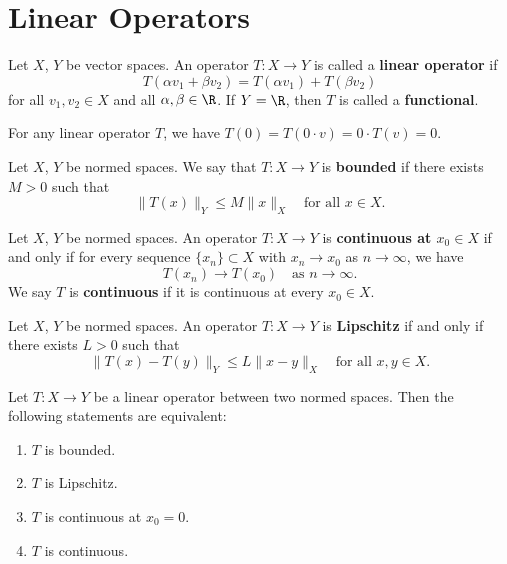 \section{Linear Operators}

\begin{definition}
Let $X$, $Y$ be vector spaces.  
An operator $T: X \to Y$ is called a \textbf{linear operator} if  
\[
T(\alpha v_1 + \beta v_2) = T(\alpha v_1) + T(\beta v_2)
\]
for all $v_1, v_2 \in X$ and all $\alpha, \beta \in \R$.  
If $Y = \R$, then $T$ is called a \textbf{functional}.
\end{definition}

\begin{remark}
For any linear operator $T$, we have $T(0) = T(0 \cdot v) = 0 \cdot T(v) = 0$.
\end{remark}

\begin{definition}
Let $X$, $Y$ be normed spaces.  
We say that $T: X \to Y$ is \textbf{bounded} if there exists $M > 0$ such that  
\[
\|T(x)\|_Y \leq M \|x\|_X \quad \text{for all } x \in X.
\]
\end{definition}

\begin{definition}
Let $X$, $Y$ be normed spaces.  
An operator $T: X \to Y$ is \textbf{continuous at $x_0 \in X$} if and only if for every sequence $\{x_n\} \subset X$ with $x_n \to x_0$ as $n \to \infty$, we have  
\[
T(x_n) \to T(x_0) \quad \text{as } n \to \infty.
\]
We say $T$ is \textbf{continuous} if it is continuous at every $x_0 \in X$.
\end{definition}

\begin{definition}
Let $X$, $Y$ be normed spaces.  
An operator $T: X \to Y$ is \textbf{Lipschitz} if and only if there exists $L > 0$ such that  
\[
\|T(x) - T(y)\|_Y \leq L \|x - y\|_X \quad \text{for all } x, y \in X.
\]
\end{definition}

\clearpage
\begin{theorem}
Let $T: X \to Y$ be a linear operator between two normed spaces.  
Then the following statements are equivalent:
\begin{enumerate}
    \item $T$ is bounded.
    \item $T$ is Lipschitz.
    \item $T$ is continuous at $x_0 = 0$.
    \item $T$ is continuous.
\end{enumerate}
\end{theorem}

